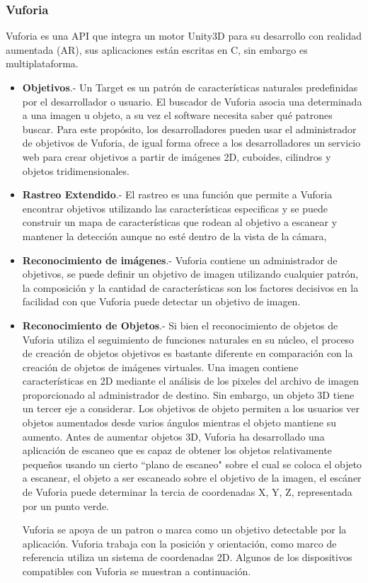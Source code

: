 \subsubsection{Vuforia}
Vuforia es una API que integra un motor Unity3D para su desarrollo con realidad aumentada (AR), sus aplicaciones están escritas en C, sin embargo es multiplataforma.\par
	\begin{itemize}
	
	\item \textbf{Objetivos}.- Un Target es un patrón de características naturales predefinidas por el desarrollador o usuario. El buscador de Vuforia asocia una determinada a una imagen u objeto, a su vez el software necesita saber qué patrones buscar. Para este propósito, los desarrolladores pueden usar el administrador de objetivos de Vuforia, de igual forma ofrece a los desarrolladores un servicio web para crear objetivos a partir de imágenes 2D, cuboides, cilindros y objetos tridimensionales.
	
	\item \textbf{Rastreo Extendido}.- El rastreo es una función que permite a Vuforia encontrar objetivos utilizando las características especificas y se puede construir un mapa de características que rodean al objetivo a escanear y mantener la detección aunque no esté dentro de la vista de la cámara, 
	
	\item \textbf{Reconocimiento de imágenes}.- Vuforia contiene un administrador de objetivos, se puede definir un objetivo de imagen utilizando cualquier patrón, la composición y la cantidad de características son los factores decisivos en la facilidad con que Vuforia puede detectar un objetivo de imagen.
	
	\item \textbf{Reconocimiento de Objetos}.- Si bien el reconocimiento de objetos de Vuforia utiliza el seguimiento de funciones naturales en su núcleo, el proceso de creación de objetos objetivos es bastante diferente en comparación con la creación de objetos de imágenes virtuales. Una imagen contiene características en 2D mediante el análisis de los pixeles del archivo de imagen proporcionado al administrador de destino. Sin embargo, un objeto 3D tiene un tercer eje a considerar. Los objetivos de objeto permiten a los usuarios ver objetos aumentados desde varios ángulos mientras el objeto mantiene su aumento. Antes de aumentar objetos 3D, Vuforia ha desarrollado una aplicación de escaneo que es capaz de obtener los objetos relativamente pequeños usando un cierto ``plano de escaneo" sobre el cual se coloca el objeto a escanear, el objeto a ser escaneado sobre el objetivo de la imagen, el escáner de Vuforia puede determinar la tercia de coordenadas X, Y, Z, representada por un punto verde.\par
	Vuforia se apoya de un patron o marca como un objetivo detectable por la aplicación. Vuforia trabaja con la posición y orientación, como marco de referencia utiliza un sistema de coordenadas 2D\cite{B12}. 
	Algunos de los dispositivos compatibles con Vuforia se muestran a continuación.
\end{itemize}
